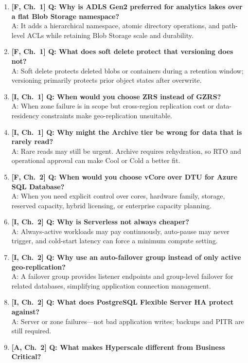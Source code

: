 \begin{enumerate}
    \item \textbf{[F, Ch.~1] Q: Why is ADLS Gen2 preferred for analytics lakes over a flat Blob Storage namespace?}\\
    A: It adds a hierarchical namespace, atomic directory operations, and path-level ACLs while retaining Blob Storage scale and durability.
    \item \textbf{[F, Ch.~1] Q: What does soft delete protect that versioning does not?}\\
    A: Soft delete protects deleted blobs or containers during a retention window; versioning primarily protects prior object states after overwrite.
    \item \textbf{[I, Ch.~1] Q: When would you choose ZRS instead of GZRS?}\\
    A: When zone failure is in scope but cross-region replication cost or data-residency constraints make geo-replication unsuitable.
    \item \textbf{[I, Ch.~1] Q: Why might the Archive tier be wrong for data that is rarely read?}\\
    A: Rare reads may still be urgent. Archive requires rehydration, so RTO and operational approval can make Cool or Cold a better fit.
    \item \textbf{[F, Ch.~2] Q: When would you choose vCore over DTU for Azure SQL Database?}\\
    A: When you need explicit control over cores, hardware family, storage, reserved capacity, hybrid licensing, or enterprise capacity planning.
    \item \textbf{[I, Ch.~2] Q: Why is Serverless not always cheaper?}\\
    A: Always-active workloads may pay continuously, auto-pause may never trigger, and cold-start latency can force a minimum compute setting.
    \item \textbf{[I, Ch.~2] Q: Why use an auto-failover group instead of only active geo-replication?}\\
    A: A failover group provides listener endpoints and group-level failover for related databases, simplifying application connection management.
    \item \textbf{[I, Ch.~2] Q: What does PostgreSQL Flexible Server HA protect against?}\\
    A: Server or zone failures---not bad application writes; backups and PITR are still required.
    \item \textbf{[A, Ch.~2] Q: What makes Hyperscale different from Business Critical?}\\

\end{enumerate}
